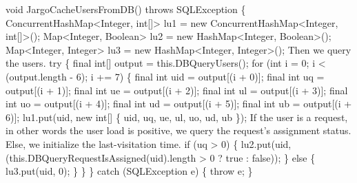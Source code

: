 void JargoCacheUsersFromDB() throws SQLException \{
\eatline
{}\nwendcode{}
\nwenddocs{}\plusendmoddef
  ConcurrentHashMap<Integer, int[]> lu1 = new ConcurrentHashMap<Integer, int[]>();
  Map<Integer, Boolean>             lu2 = new HashMap<Integer, Boolean>();
  Map<Integer, Integer>             lu3 = new HashMap<Integer, Integer>();
\nwendcode{}\nwdocspar
{\small Then we query the users.}
\nwenddocs{}\plusendmoddef
  try \{
    final int[] output = this.DBQueryUsers();
    for (int i = 0; i < (output.length - 6); i += 7) \{
      final int uid = output[(i + 0)];
      final int  uq = output[(i + 1)];
      final int  ue = output[(i + 2)];
      final int  ul = output[(i + 3)];
      final int  uo = output[(i + 4)];
      final int  ud = output[(i + 5)];
      final int  ub = output[(i + 6)];
      lu1.put(uid, new int[] \{ uid, uq, ue, ul, uo, ud, ub \});
\nwendcode{}\nwdocspar
{\small If the user is a request, in other words the user load is positive,
we query the request's assignment status. Else, we initialize the last-visitation time.}
\nwenddocs{}\plusendmoddef
      if (uq > 0) \{
        lu2.put(uid, (this.DBQueryRequestIsAssigned(uid).length > 0 ? true : false));
      \} else \{
        lu3.put(uid, 0);
      \}
    \}
  \} catch (SQLException e) \{
    throw e;
  \}
\nwendcode{}\nwdocspar
